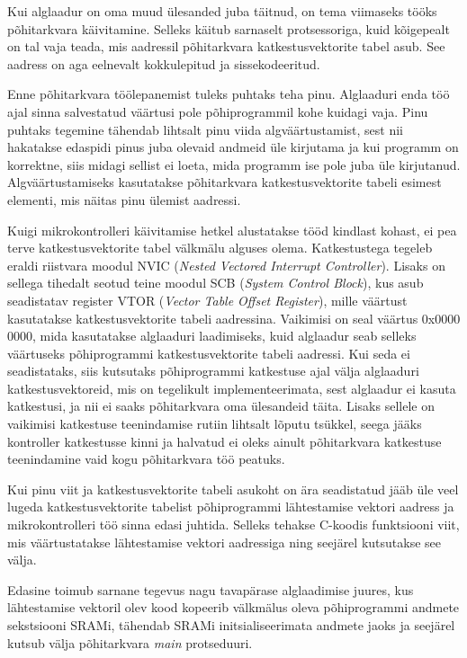 \documentclass[12pt,a4paper]{article}
\begin{document}
Kui alglaadur on oma muud ülesanded juba täitnud, on tema viimaseks tööks
põhitarkvara käivitamine. Selleks käitub sarnaselt protsessoriga, kuid
kõigepealt on tal vaja teada, mis aadressil põhitarkvara katkestusvektorite
tabel asub. See aadress on aga eelnevalt kokkulepitud ja sissekodeeritud.

Enne põhitarkvara töölepanemist tuleks puhtaks teha pinu. Alglaaduri enda töö
ajal sinna salvestatud väärtusi pole põhiprogrammil kohe kuidagi vaja. Pinu
puhtaks tegemine tähendab lihtsalt pinu viida algväärtustamist, sest nii
hakatakse edaspidi pinus juba olevaid andmeid üle kirjutama ja kui programm on
korrektne, siis midagi sellist ei loeta, mida programm ise pole juba üle
kirjutanud. Algväärtustamiseks kasutatakse põhitarkvara katkestusvektorite
tabeli esimest elementi, mis näitas pinu ülemist aadressi.

Kuigi mikrokontrolleri käivitamise hetkel alustatakse tööd kindlast kohast, ei
pea terve katkestusvektorite tabel välkmälu alguses olema. Katkestustega tegeleb
eraldi riistvara moodul NVIC (\textit{Nested Vectored Interrupt Controller}).
Lisaks on sellega tihedalt seotud teine moodul SCB (\textit{System Control
Block}), kus asub seadistatav register VTOR (\textit{Vector Table Offset
Register}), mille väärtust kasutatakse katkestusvektorite tabeli aadressina.
\cite[ptk~4.4]{CM3pm} Vaikimisi on seal väärtus 0x0000 0000, mida kasutatakse alglaaduri
laadimiseks, kuid alglaadur seab selleks väärtuseks põhiprogrammi
katkestusvektorite tabeli aadressi. Kui seda ei seadistataks, siis kutsutaks
põhiprogrammi katkestuse ajal välja alglaaduri katkestusvektoreid, mis on
tegelikult implementeerimata, sest alglaadur ei kasuta katkestusi, ja nii ei
saaks põhitarkvara oma ülesandeid täita. Lisaks sellele on vaikimisi katkestuse
teenindamise rutiin lihtsalt lõputu tsükkel, seega jääks kontroller katkestusse
kinni ja halvatud ei oleks ainult põhitarkvara katkestuse teenindamine vaid kogu
põhitarkvara töö peatuks.

Kui pinu viit ja katkestusvektorite tabeli asukoht on ära seadistatud jääb üle
veel lugeda katkestusvektorite tabelist põhiprogrammi lähtestamise vektori
aadress ja mikrokontrolleri töö sinna edasi juhtida. Selleks tehakse C-koodis
funktsiooni viit, mis väärtustatakse lähtestamise vektori aadressiga ning
seejärel kutsutakse see välja.

Edasine toimub sarnane tegevus nagu tavapärase alglaadimise juures, kus
lähtestamise vektoril olev kood kopeerib välkmälus oleva põhiprogrammi andmete
sekstsiooni SRAMi, tähendab SRAMi initsialiseerimata andmete jaoks ja seejärel
kutsub välja põhitarkvara \textit{main} protseduuri.
\end{document}
